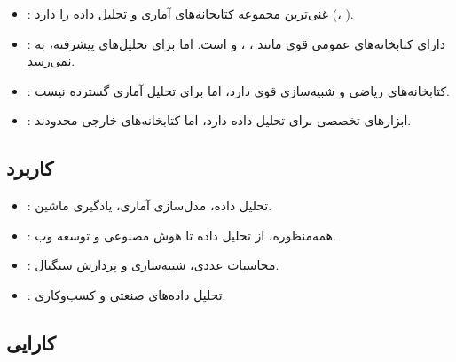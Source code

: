 \documentclass[11pt, a4paper, oneside]{book}
\begin{document}
				\begin{itemize}
					
					\item {\large {}}:
					{\normalsize غنی‌ترین مجموعه کتابخانه‌های آماری و تحلیل داده را دارد (، ).}
					
					\item {\large {}}:
					{\normalsize دارای کتابخانه‌های عمومی قوی مانند ، ، و  است. اما برای تحلیل‌های پیشرفته، به  نمی‌رسد.}
					
					\item {\large {}}:
					{\normalsize کتابخانه‌های ریاضی و شبیه‌سازی قوی دارد، اما برای تحلیل آماری گسترده نیست.}
					
					\item {\large {}}:
					{\normalsize ابزارهای تخصصی برای تحلیل داده دارد، اما کتابخانه‌های خارجی محدودند.}
					
				\end{itemize}

				
			\subsection{کاربرد}
				
				\begin{itemize}
					
					\item {\large {}}:
					{\normalsize تحلیل داده، مدل‌سازی آماری، یادگیری ماشین.}
					
					\item {\large {}}:
					{\normalsize همه‌منظوره، از تحلیل داده تا هوش مصنوعی و توسعه وب.}
					
					\item {\large {}}:
					{\normalsize محاسبات عددی، شبیه‌سازی و پردازش سیگنال.}
					
					\item {\large {}}:
					{\normalsize تحلیل داده‌های صنعتی و کسب‌وکاری.}
					
				\end{itemize}
				
				
				\subsection{کارایی}
				
\end{document}
